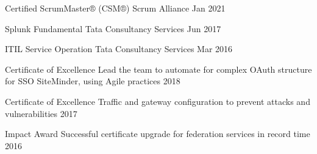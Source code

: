 

\begin{cvhonors}

  \cvhonor
    {Certified ScrumMaster® (CSM®)} %
    {Scrum Alliance} %
    {Jan 2021} %
    {} %

  \cvhonor
    {Splunk Fundamental} %
    {Tata Consultancy Services} %
    {Jun 2017} %
    {} %

  \cvhonor
    {ITIL Service Operation} %
    {Tata Consultancy Services} %
    {Mar 2016} %
    {} %

\end{cvhonors}


\begin{cvhonors}

  \cvhonor
    {Certificate of Excellence} %
    {Lead the team to automate for complex OAuth structure for SSO SiteMinder, using Agile practices} %
    {2018} %
    {} %

  \cvhonor
    {Certificate of Excellence} %
    {Traffic and gateway configuration to prevent attacks and vulnerabilities} %
    {2017} %
    {} %

  \cvhonor
    {Impact Award} %
    {Successful certificate upgrade for federation services in record time} %
    {2016} %
    {} %

\end{cvhonors}
